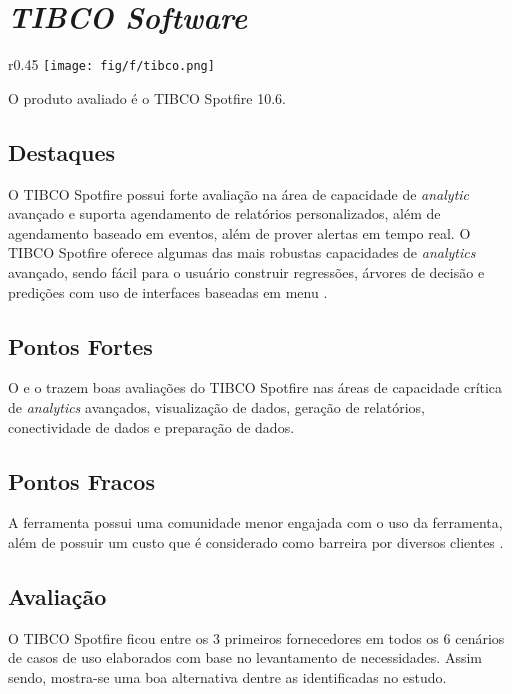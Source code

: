 \section{\emph{TIBCO Software}}
\label{sub-tibco}

\begin{wrapfigure}[3]{r}{0.45\textwidth}     
    \centering
    \texttt{[image: fig/f/tibco.png]}
\end{wrapfigure}
O produto avaliado é o TIBCO Spotfire 10.6.

\subsection*{Destaques}

O TIBCO Spotfire possui forte avaliação na área de capacidade de \emph{analytic} avançado e suporta agendamento de relatórios personalizados, além de agendamento baseado em eventos, além de prover alertas em tempo real. O TIBCO Spotfire oferece algumas das mais robustas capacidades de \emph{analytics} avançado, sendo fácil para o usuário construir regressões, árvores de decisão e predições com uso de interfaces baseadas em menu \cite{gartner:criticalcapabilities}.

\subsection*{Pontos Fortes}

O \relGMQ \xspace e o \relGCC \xspace trazem boas avaliações do TIBCO Spotfire nas áreas de capacidade crítica de \emph{analytics} avançados, visualização de dados, geração de relatórios, conectividade de dados e preparação de dados.

\subsection*{Pontos Fracos}

A ferramenta possui uma comunidade menor engajada com o uso da ferramenta, além de possuir um custo que é considerado como barreira por diversos clientes \cite{gartner:magicquadrant}.

\subsection*{Avaliação}

O TIBCO Spotfire ficou entre os 3 primeiros fornecedores em todos os 6 cenários de casos de uso elaborados com base no levantamento de necessidades. Assim sendo, mostra-se uma boa alternativa dentre as identificadas no estudo.

